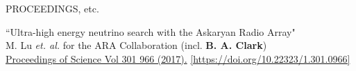 \documentclass{resume} %
\begin{document}
\begin{rSection}{PROCEEDINGS, etc.}

\begin{etaremune}%


	\item ``Ultra-high energy neutrino search with the Askaryan Radio Array" \\
 M. Lu {\it et. al.} for the ARA Collaboration (incl. \textbf{B. A. Clark}) \\
   \href{http://dx.doi.org/10.1016/j.astropartphys.2015.02.007}{Proceedings of Science Vol 301 966 (2017).} \href{https://doi.org/10.22323/1.301.0966}{[https://doi.org/10.22323/1.301.0966]} 

 \end{etaremune}

\end{rSection}
\end{document}

